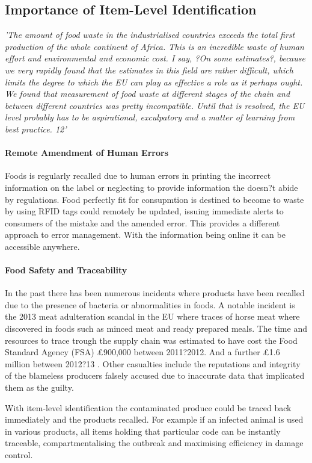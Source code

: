 \documentclass[a4paper, 11pt]{article}
\begin{document}
\subsection{Importance of Item-Level Identification}
\emph{'The amount of food waste in the industrialised countries exceeds the total first
production of the whole continent of Africa. This is an incredible waste of human effort
and environmental and economic cost. I say, ?On some estimates?, because we very
rapidly found that the estimates in this field are rather difficult, which limits the degree
to which the EU can play as effective a role as it perhaps ought. We found that
measurement of food waste at different stages of the chain and between different
countries was pretty incompatible. Until that is resolved, the EU level probably has to
be aspirational, exculpatory and a matter of learning from best practice. 12'}

\paragraph{Remote Amendment of Human Errors}
Foods is regularly recalled due to human errors in printing the incorrect information on the label or neglecting to provide information the doesn?t abide by regulations. Food perfectly fit for consupmtion is destined to become to waste by using RFID tags could remotely be updated, issuing immediate alerts to consumers of the mistake and the amended error. This provides a different approach to error management. With the information being online it can be accessible anywhere.

\paragraph{Food Safety and Traceability}
In the past there has been numerous incidents where products have been recalled due to the presence of bacteria or abnormalities in foods. A notable incident is the 2013 meat adulteration scandal in the EU where traces of horse meat where discovered in foods such as minced meat and ready prepared meals. The time and resources to trace trough the supply chain was estimated to have cost the Food Standard Agency (FSA) \pounds900,000 between 2011?2012. And a further \pounds1.6 million between 2012?13 \cite{3}. Other casualties include the reputations and integrity of the blameless producers falsely accused due to inaccurate data that implicated them as the guilty. 

With item-level identification the contaminated produce could be traced back immediately and the products recalled. For example if an infected animal is used in various products, all items holding that particular code can be instantly traceable, compartmentalising the outbreak and maximising efficiency in damage control. 
\end{document}
